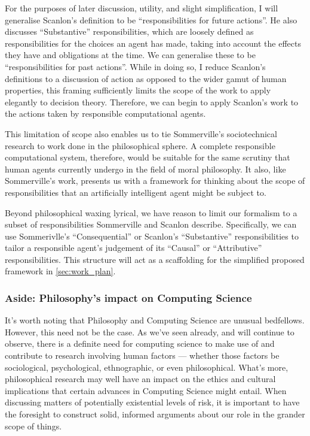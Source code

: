 For the purposes of later discussion, utility, and slight simplification, I will generalise Scanlon's definition to be ``responsibilities for future actions''. He also discusses ``Substantive'' responsibilities, which are loosely defined as responsibilities for the choices an agent has made, taking into account the effects they have and obligations at the time. We can generalise these to be ``responsibilities for past actions''. While in doing so, I reduce Scanlon's definitions to a discussion of action as opposed to the wider gamut of human properties, this framing sufficiently limits the scope of the work to apply elegantly to decision theory. Therefore, we can begin to apply Scanlon's work to the actions taken by responsible computational agents.\par

This limitation of scope also enables us to tie Sommerville's sociotechnical research to work done in the philosophical sphere. A complete responsible computational system, therefore, would be suitable for the same scrutiny that human agents currently undergo in the field of moral philosophy. It also, like Sommerville's work, presents us with a framework for thinking about the scope of responsibilities that an artificially intelligent agent might be subject to.\par

Beyond philosophical waxing lyrical, we have reason to limit our formalism to a subset of responsibilities Sommerville and Scanlon describe. Specifically, we can use Sommerivlle's ``Consequential'' or Scanlon's ``Substantive'' responsibilities to tailor a responsible agent's judgement of its ``Causal'' or ``Attributive'' responsibilities. This structure will act as a scaffolding for the simplified proposed framework in \cref{sec:work_plan}.

\subsubsection{Aside: Philosophy's impact on Computing Science}
It's worth noting that Philosophy and Computing Science are unusual bedfellows. However, this need not be the case. As we've seen already, and will continue to observe, there is a definite need for computing science to make use of and contribute to research involving human factors --- whether those factors be sociological, psychological, ethnographic, or even philosophical. What's more, philosophical research may well have an impact on the ethics and cultural implications that certain advances in Computing Science might entail. When discussing matters of potentially existential levels of risk, it is important to have the foresight to construct solid, informed arguments about our role in the grander scope of things.\par

